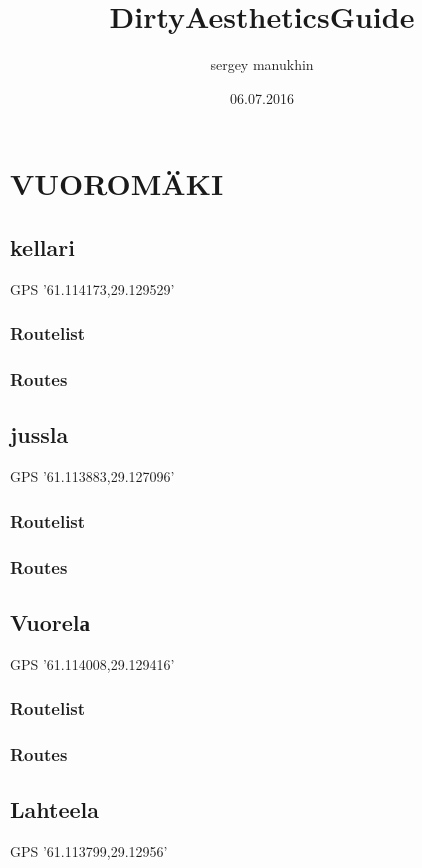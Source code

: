 \documentclass[8pt, a5paper,notitlepage,openany]{report}
\begin{document}

\title{DirtyAestheticsGuide}
\date{06.07.2016}
\author{sergey manukhin}


\pagestyle{fancy}
\tableofcontents


\chapter{ VUOROMÄKI}
\section{kellari}
 GPS '61.114173,29.129529'
\subsection{Routelist}

\subsection{Routes}


\clearpage 
\section{jussla}
 GPS '61.113883,29.127096'
\subsection{Routelist}

\newpage
\subsection{Routes}



% 
\clearpage 
 \section{Vuorelа}
  GPS '61.114008,29.129416'
\subsection{Routelist}

\newpage
\subsection{Routes}

% 
\clearpage 
\section{Lahteela}
 GPS '61.113799,29.12956'
\end{document}
